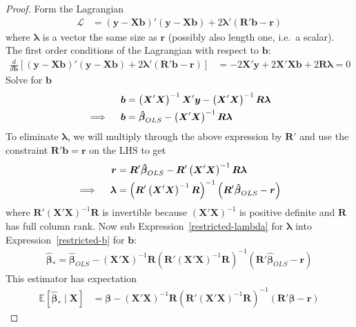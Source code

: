 \documentclass[12pt]{article}
\theoremstyle{plain}
\theoremstyle{definition}
\theoremstyle{remark}
\newcommand{\sL}{\mathscr{L}}
\newcommand{\bsb}{\boldsymbol{b}}
\newcommand{\bsX}{\boldsymbol{X}}
\newcommand{\bsy}{\boldsymbol{y}}
\newcommand{\bsbeta}{\boldsymbol{\beta}}
\newcommand{\bslambda}{\boldsymbol{\lambda}}
\newcommand{\bshatbeta}{\boldsymbol{\hat{\beta}}}
\newcommand{\bsR}{\boldsymbol{R}}
\newcommand{\bsr}{\boldsymbol{r}}
\newcommand{\E}{\mathbb{E}}
\begin{document}
\begin{proof}
Form the Lagrangian
\begin{align*}
  \sL
  &=
  (\bsy-\bsX\bsb)'(\bsy-\bsX\bsb)
  + 2\bslambda' (\bsR'\bsb - \bsr)
\end{align*}
where $\bslambda$ is a vector the same size as $\bsr$ (possibly also length
one, i.e.\ a scalar).
The first order conditions of the Lagrangian with respect to $\bsb$:
\begin{align*}
  \frac{d}{d\bsb}
  \left[
    (\bsy-\bsX\bsb)'(\bsy-\bsX\bsb)
    + 2\bslambda' (\bsR'\bsb - \bsr)
  \right]
  &= -2\bsX'\bsy +2\bsX'\bsX\bsb + 2\bsR\bslambda
  =0
\end{align*}
Solve for $\bsb$
\begin{align}
  \bsb &=
  \left(\bsX'\bsX\right)^{-1} \bsX'\bsy
  - \left(\bsX'\bsX\right)^{-1} \bsR\bslambda
  \notag\\
  \implies\quad
  \bsb &=
  \bshatbeta_{OLS} - \left(\bsX'\bsX\right)^{-1}  \bsR\bslambda
  \label{restricted-b}
\end{align}
To eliminate $\bslambda$, we will multiply through the above expression
by $\bsR'$ and use the constraint $\bsR'\bsb=\bsr$ on the LHS to get
\begin{align}
  \bsr
  &=
  \bsR'\bshatbeta_{OLS}
  - \bsR'\left(\bsX'\bsX\right)^{-1} \bsR\bslambda \notag\\
  \implies\quad
  \bslambda
  &=
  \left(\bsR'\left(\bsX'\bsX\right)^{-1}  \bsR\right)^{-1}
  \left(\bsR'\bshatbeta_{OLS} -  \bsr\right)
  \label{restricted-lambda}
\end{align}
where $\bsR'(\bsX'\bsX)^{-1}\bsR$ is invertible because
$(\bsX'\bsX)^{-1}$ is positive definite and $\bsR$ has full column rank.
Now sub Expression~\ref{restricted-lambda} for $\bslambda$ into
Expression~\ref{restricted-b} for $\bsb$:
\begin{align*}
  \bshatbeta_*
  =
  \bshatbeta_{OLS} - \left(\bsX'\bsX\right)^{-1}  \bsR
  \left(\bsR'\left(\bsX'\bsX\right)^{-1}  \bsR\right)^{-1}
  \left(\bsR'\bshatbeta_{OLS} -  \bsr\right)
\end{align*}
This estimator has expectation
\begin{align*}
  \E\left[ \bshatbeta_* \;|\; \bsX \right]
  &=
  \bsbeta
  -
  \left(\bsX'\bsX\right)^{-1}  \bsR
  \left(\bsR'\left(\bsX'\bsX\right)^{-1}  \bsR\right)^{-1}
  \left( \bsR' \bsbeta -  \bsr\right)
\end{align*}

\end{proof}
\end{document}

